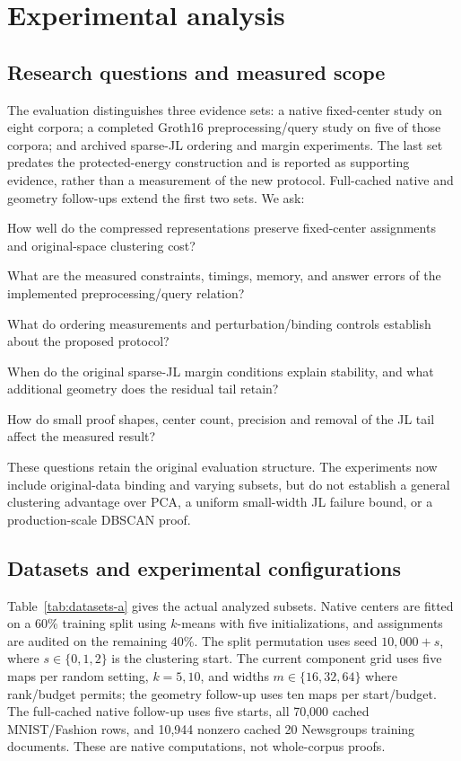 \section{Experimental analysis}\label{sec:method}

\subsection{Research questions and measured scope}
The evaluation distinguishes three evidence sets: a native fixed-center study on eight corpora; a completed Groth16 preprocessing/query study on five of those corpora; and archived sparse-JL ordering and margin experiments. The last set predates the protected-energy construction and is reported as supporting evidence, rather than a measurement of the new protocol. Full-cached native and geometry follow-ups extend the first two sets. We ask:
\begin{description}[leftmargin=1.3cm,style=nextline]
\item[RQ1] How well do the compressed representations preserve fixed-center assignments and original-space clustering cost?
\item[RQ2] What are the measured constraints, timings, memory, and answer errors of the implemented preprocessing/query relation?
\item[RQ3] What do ordering measurements and perturbation/binding controls establish about the proposed protocol?
\item[RQ4] When do the original sparse-JL margin conditions explain stability, and what additional geometry does the residual tail retain?
\item[RQ5] How do small proof shapes, center count, precision and removal of the JL tail affect the measured result?
\end{description}
These questions retain the original evaluation structure. The experiments now include original-data binding and varying subsets, but do not establish a general clustering advantage over PCA, a uniform small-width JL failure bound, or a production-scale DBSCAN proof.

\subsection{Datasets and experimental configurations}
Table~\ref{tab:datasets-a} gives the actual analyzed subsets. Native centers are fitted on a 60\% training split using $k$-means with five initializations, and assignments are audited on the remaining 40\%. The split permutation uses seed $10{,}000+s$, where $s\in\{0,1,2\}$ is the clustering start. The current component grid uses five maps per random setting, $k=5,10$, and widths $m\in\{16,32,64\}$ where rank/budget permits; the geometry follow-up uses ten maps per start/budget. The full-cached native follow-up uses five starts, all 70,000 cached MNIST/Fashion rows, and 10,944 nonzero cached 20 Newsgroups training documents. These are native computations, not whole-corpus proofs.


